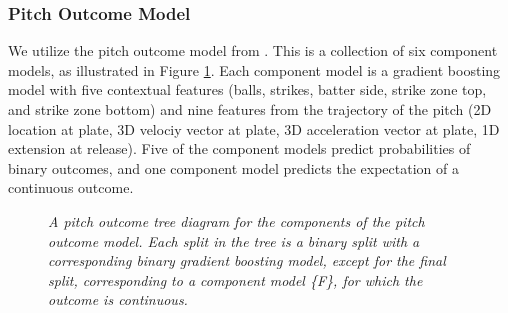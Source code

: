 \documentclass{article}
\begin{document}
      \subsubsection{Pitch Outcome Model}
      \label{sec:methods-pitch-outcome-model}

      We utilize the pitch outcome model from \citet{powers_pitch_2023}. This is a collection of six component models, as illustrated in Figure \ref{fig:pitch-outcome-model}. Each component model is a gradient boosting model with five contextual features (balls, strikes, batter side, strike zone top, and strike zone bottom) and nine features from the trajectory of the pitch (2D location at plate, 3D velociy vector at plate, 3D acceleration vector at plate, 1D extension at release). Five of the component models predict probabilities of binary outcomes, and one component model predicts the expectation of a continuous outcome.

      \begin{figure}[H]
        \centering
        \caption{\it A pitch outcome tree diagram for the components of the pitch outcome model. Each split in the tree is a binary split with a corresponding binary gradient boosting model, except for the final split, corresponding to a component model \{F\}, for which the outcome is continuous.}
        \label{fig:pitch-outcome-model}
      \end{figure}
\end{document}
